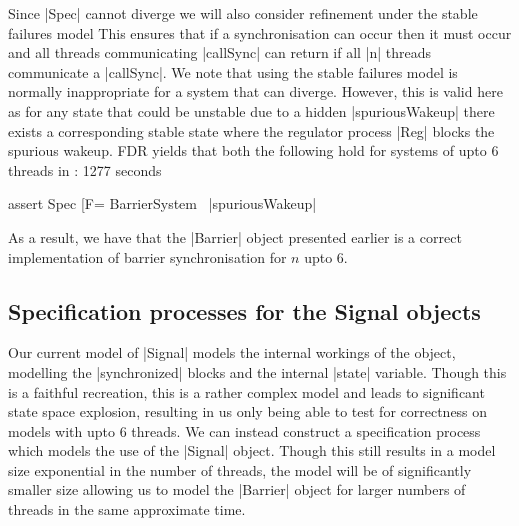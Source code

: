Since |Spec| cannot diverge we will also consider refinement under the stable failures model This ensures that if a synchronisation can occur then it must occur and all threads communicating |callSync| can return if all |n| threads communicate a |callSync|.
We note that using the stable failures model is normally inappropriate for a system that can diverge. However, this is valid here as for any state that could be unstable due to a hidden |spuriousWakeup| there exists a corresponding stable state where the regulator process |Reg| blocks the spurious wakeup. FDR yields that both the following hold for systems of upto 6 threads in : 1277 seconds

\begin{cspm}
assert Spec [F= BarrierSystem \ {|spuriousWakeup|}
\end{cspm}

As a result, we have that the |Barrier| object presented earlier is a correct implementation of barrier synchronisation for $n$ upto 6.

\subsection{Specification processes for the Signal objects}
Our current model of |Signal| models the internal workings of the object, modelling the |synchronized| blocks and the internal |state| variable. Though this is a faithful recreation, this is a rather complex model and leads to significant state space explosion, resulting in us only being able to test for correctness on models with upto 6 threads.
We can instead construct a specification process which models the use of the |Signal| object. Though this still results in a model size exponential in the number of threads, the model will be of significantly smaller size allowing us to model the |Barrier| object for larger numbers of threads in the same approximate time.

